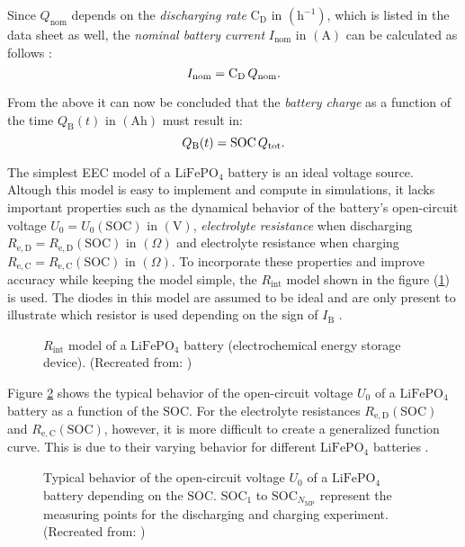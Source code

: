 Since $Q_\mathrm{nom}$ depends on the \emph{discharging rate} $\mathrm{C_D}$ in $\left(\mathrm{h}^{-1}\right)$, which is listed in the data sheet as well, the \emph{nominal battery current} $I_\mathrm{nom}$ in $\left(\mathrm{A}\right)$ can be calculated as follows \cite{Thirugnanam:2014, Kurzweil:2018}: 
	\begin{equation} \label{eq:i_nom}
	\centering
		I_\mathrm{nom} = \mathrm{C_D} \, Q_\mathrm{nom} \text{.}
	\end{equation}
	
From the above it can now be concluded that the \emph{battery charge} as a function of the time $Q_\mathrm{B}(t)$ in $\left(\mathrm{Ah}\right)$ must result in:
\begin{equation} \label{eq:q_b}
\centering
	Q_\mathrm{B}(t) = \mathrm{SOC} \, Q_\mathrm{tot} \text{.}
\end{equation}

The simplest EEC model of a $\mathrm{LiFePO}_4$ battery is an ideal voltage source. Altough this model is easy to implement and compute in simulations, it lacks important properties such as the dynamical behavior of the battery's open-circuit voltage $U_0 = U_0(\mathrm{SOC})$ in $\left( \mathrm{V} \right)$, \emph{electrolyte resistance} when discharging $R_{\mathrm{e,D}} = R_{\mathrm{e,D}}(\mathrm{SOC})$ in $\left( \Omega \right)$ and electrolyte resistance when charging $R_{\mathrm{e,C}} = R_{\mathrm{e,C}}(\mathrm{SOC})$ in $\left( \Omega \right)$. To incorporate these properties and improve accuracy while keeping the model simple, the $R_{\mathrm{int}}$ model shown in the figure (\ref{fig:tikz_simple_battery_model}) is used. The diodes in this model are assumed to be ideal and are only present to illustrate which resistor is used depending on the sign of $I_\mathrm{B}$ \cite{He:2011, Wehbe:2015, Hinz:2019, Saldana:2019}. 
\begin{figure}[h!]
	\centering
	
	\caption{$R_{\mathrm{int}}$ model of a $\mathrm{LiFePO}_4$ battery (electrochemical energy storage device). (Recreated from: \cite{Hinz:2019, Saldana:2019})}
	\label{fig:tikz_simple_battery_model}
\end{figure}

Figure \ref{fig:tikz_u_oc_vs_soc} shows the typical behavior of the open-circuit voltage $U_0$ of a $\mathrm{LiFePO}_4$ battery as a function of the $\mathrm{SOC}$. For the electrolyte resistances $R_{\mathrm{e,D}}(\mathrm{SOC})$ and $R_{\mathrm{e,C}}(\mathrm{SOC})$, however, it is more difficult to create a generalized function curve. This is due to their varying behavior for different $\mathrm{LiFePO}_4$ batteries \cite{Mertens:2015, Sterner:2017, Li:2018, Hinz:2019, Hossain:2019}. 
\begin{figure}[h!]
	\centering
	
	\caption{Typical behavior of the open-circuit voltage $U_0$ of a $\mathrm{LiFePO}_4$ battery depending on the $\mathrm{SOC}$. $\mathrm{SOC_1}$ to $\mathrm{SOC}_{N_\mathrm{MP}}$ represent the measuring points for the discharging and charging experiment. (Recreated from: \cite{Mertens:2015, Sterner:2017, Li:2018, Hinz:2019, Hossain:2019})}
	\label{fig:tikz_u_oc_vs_soc}
\end{figure}

